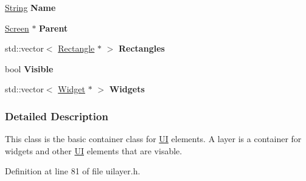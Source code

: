 \begin{DoxyCompactItemize}
\item 
\hypertarget{classMezzanine_1_1UI_1_1Layer_ad4af36f17ea5625a9018a4d1560badab}{
\hyperlink{namespaceMezzanine_acf9fcc130e6ebf08e3d8491aebcf1c86}{String} {\bfseries Name}}
\label{classMezzanine_1_1UI_1_1Layer_ad4af36f17ea5625a9018a4d1560badab}

\item 
\hypertarget{classMezzanine_1_1UI_1_1Layer_ab1c2552446d199f2cc7a3786b6e61b92}{
\hyperlink{classMezzanine_1_1UI_1_1Screen}{Screen} $\ast$ {\bfseries Parent}}
\label{classMezzanine_1_1UI_1_1Layer_ab1c2552446d199f2cc7a3786b6e61b92}

\item 
\hypertarget{classMezzanine_1_1UI_1_1Layer_aba7b5efa4f000ca1f2377b2ccf1a15da}{
std::vector$<$ \hyperlink{classMezzanine_1_1UI_1_1Rectangle}{Rectangle} $\ast$ $>$ {\bfseries Rectangles}}
\label{classMezzanine_1_1UI_1_1Layer_aba7b5efa4f000ca1f2377b2ccf1a15da}

\item 
\hypertarget{classMezzanine_1_1UI_1_1Layer_aa5d4c81a56b254327d7c383dc4bcad52}{
bool {\bfseries Visible}}
\label{classMezzanine_1_1UI_1_1Layer_aa5d4c81a56b254327d7c383dc4bcad52}

\item 
\hypertarget{classMezzanine_1_1UI_1_1Layer_a337dbba9d4f113d278313f4633ca6a7c}{
std::vector$<$ \hyperlink{classMezzanine_1_1UI_1_1Widget}{Widget} $\ast$ $>$ {\bfseries Widgets}}
\label{classMezzanine_1_1UI_1_1Layer_a337dbba9d4f113d278313f4633ca6a7c}

\end{DoxyCompactItemize}


\subsubsection{Detailed Description}
This class is the basic container class for \hyperlink{namespaceMezzanine_1_1UI}{UI} elements. A layer is a container for widgets and other \hyperlink{namespaceMezzanine_1_1UI}{UI} elements that are visable. 

Definition at line 81 of file uilayer.h.



